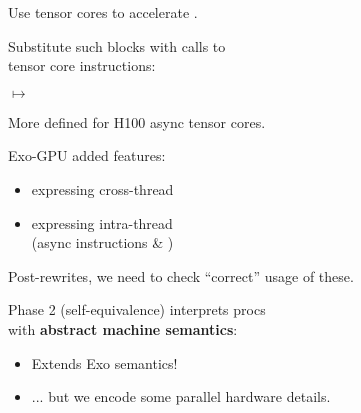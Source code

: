 {\LARGE
Use tensor cores to accelerate .

}

\newpage
{}

{\LARGE
Substitute such blocks with calls to\\
 tensor core instructions:

}

{\LARGE

}

\vspace{8mm}

{\LARGE
$\mapsto$ 
}

\vspace{8mm}

{\LARGE
More  defined for H100 async tensor cores.

}


\newpage
{}

{\LARGE
Exo-GPU added features:
\begin{itemize}
  \item expressing cross-thread 
  \item expressing intra-thread \\(async instructions \& )
\end{itemize}

\vspace{6mm}
Post-rewrites, we need to check ``correct'' usage of these.

}


\newpage
{}

{\LARGE
Phase 2 (self-equivalence) interprets procs\\with \textbf{abstract machine semantics}:
\begin{itemize}
  \item Extends  Exo semantics!
  \item ... but we encode some parallel hardware details.
\end{itemize}

}

\begin{center}
{\large
{}
}
\end{center}


